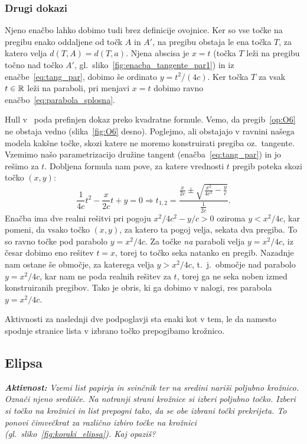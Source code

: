 \subsubsection*{Drugi dokazi}

Njeno enačbo lahko dobimo tudi brez definicije ovojnice. Ker so vse točke na pregibu enako oddaljene od točk $A$ in $A'$, na pregibu obstaja le ena točka $T$, za katero velja $d(T, A) = d(T, a)$. Njena abscisa je $x = t$ (točka $T$ leži na pregibu točno nad točko $A'$, gl.\ sliko~\ref{fig:enacba_tangente_par1}) in iz enačbe~\ref{eq:tang_par}, dobimo še ordinato $y = t^2/(4c)$. Ker točka $T$ za vsak $t \in \mathbb R$ leži na paraboli, pri menjavi $x = t$ dobimo ravno enačbo~\ref{eq:parabola_splosna}.

Hull v~\cite[str.\ 55--56]{hull2013} poda prefinjen dokaz preko kvadratne formule. Vemo, da pregib~\ref{op:O6} ne obstaja vedno (slika~\ref{fig:O6} desno). Poglejmo, ali obstajajo v ravnini našega modela kakšne točke, skozi katere ne moremo konstruirati pregiba oz.\ tangente. Vzemimo našo parametrizacijo družine tangent (enačba~\ref{eq:tang_par}) in jo rešimo za $t$. Dobljena formula nam pove, za katere vrednosti $t$ pregib poteka skozi točko $(x, y)$:
$$ \frac{1}{4c}t^2 - \frac{x}{2c}t + y = 0 \Rightarrow t_{1,2} = \frac{\frac{x}{2c} \pm \sqrt{\frac{x^2}{4c^2} - \frac{y}{c}}}{\frac{1}{2c}}.$$
Enačba ima dve realni rešitvi pri pogoju $x^2 / 4c^2 - y/c > 0$ oziroma $y < x^2 / 4c$, kar pomeni, da vsako točko $(x, y)$, za katero ta pogoj velja, sekata dva pregiba. To so ravno točke pod parabolo $y = x^2 / 4c$. Za točke \emph{na} paraboli velja $y = x^2 / 4c$, iz česar dobimo eno rešitev $t = x$, torej to točko seka natanko en pregib. Nazadnje nam ostane še območje, za katerega velja $y > x^2 / 4c$, t.\ j.\ območje nad parabolo $y = x^2 / 4c$, kar nam ne poda realnih rešitev za $t$, torej ga ne seka noben izmed konstruiranih pregibov. Tako je obris, ki ga dobimo v nalogi, res parabola $y = x^2 / 4c$.

Aktivnosti za naslednji dve podpoglavji sta enaki kot v tem, le da namesto spodnje stranice lista v izbrano točko prepogibamo krožnico.

\subsection{Elipsa}

\textit{\textbf{Aktivnost:} Vzemi list papirja in svinčnik ter na sredini nariši poljubno krožnico. Označi njeno središče. Na notranji strani krožnice si izberi poljubno točko. Izberi si točko na krožnici in list prepogni tako, da se obe izbrani točki prekrijeta. To ponovi čimvečkrat za različno izbiro točke na krožnici (gl.\ sliko~\ref{fig:koraki_elipsa}). Kaj opaziš?}

